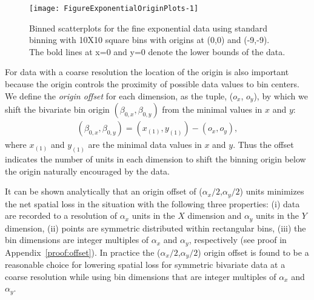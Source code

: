\documentclass[11pt]{isuthesis}\usepackage[]{graphicx}\usepackage[]{color}
\newenvironment{knitrout}{}{} %
\begin{document}
\begin{knitrout}
\color{fgcolor}\begin{figure}[H]

{\centering \texttt{[image: FigureExponentialOriginPlots-1]} 

}

\caption[Binned scatterplots for the fine exponential data using standard binning with 10X10 square bins with origins at (0,0) and (-9,-9)]{Binned scatterplots for the fine exponential data using standard binning with 10X10 square bins with origins at (0,0) and (-9,-9). The bold lines at x=0 and y=0 denote the lower bounds of the data.}\label{fig:ExponentialOriginPlots}
\end{figure}


\end{knitrout}


For data with a coarse resolution the location of the origin is also important because the origin controls the proximity of possible data values to bin centers. We define the \textit{origin offset} for each dimension, as the tuple, ($o_x$, $o_y$), by which we shift the bivariate bin origin $(\beta_{0,x},\beta_{0,y})$ from the minimal values in $x$ and $y$:
%
\begin{eqnarray}\label{OriginOffset}
(\beta_{0,x},\beta_{0,y}) = (x_{(1)}, y_{(1)}) - (o_x, o_y),
\end{eqnarray}  
%
where $x_{(1)}$ and $y_{(1)}$ are the minimal data values in $x$ and $y$. %
Thus the offset indicates the number of units in each dimension to shift the binning origin below the origin naturally encouraged by the data. 

It can be shown analytically that an origin offset of ($\alpha_x/2$,$\alpha_y/2$) units  minimizes the net spatial loss in the situation with the following three properties: (i) data are recorded to a resolution of $\alpha_x$ units in the $X$ dimension and $\alpha_y$ units in the $Y$ dimension, (ii) points are symmetric distributed within rectangular bins, (iii) the bin dimensions are integer multiples of $\alpha_x$ and $\alpha_y$, respectively (see proof in Appendix~\ref{proof:offset}). In practice the ($\alpha_x/2$,$\alpha_y/2$) origin offset is found to be a reasonable choice for lowering spatial loss for symmetric bivariate data at a coarse resolution while using bin dimensions that are integer multiples of $\alpha_x$ and $\alpha_y$.
\end{document}
